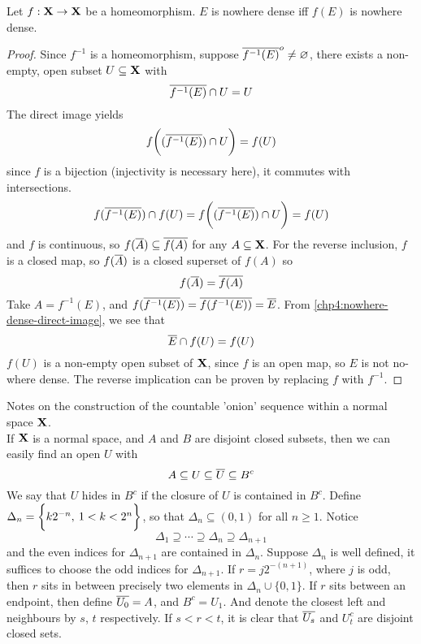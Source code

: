 \documentclass[../../main.tex]{subfiles}
\begin{document}
\begin{wts}\label{chp4:nowhere-dense-homeomorphisms}
    Let $f:{\mathbf{X}}\to{\mathbf{X}}$ be a homeomorphism. $E$ is nowhere dense iff $f(E)$ is nowhere dense.
\end{wts}
\begin{proof}
    Since $f^{-1}$ is a homeomorphism, suppose $\overline{f^{-1}(E)}^o\neq\varnothing$, there exists a non-empty, open subset $U\subseteq{\mathbf{X}}$ with
    \[
        \overline{f^{-1}(E)}\cap U = U
    \]
    The direct image yields 
    \[
        f\biggl((\overline{f^{-1}(E)})\cap U\biggr) = f(U)
    \]
    since $f$ is a bijection (injectivity is necessary here), it commutes with intersections.
    \begin{equation}\label{chp4:nowhere-dense-direct-image}
        f(\overline{f^{-1}(E)})\cap f(U) = f\biggl((\overline{f^{-1}(E)})\cap U\biggr) = f(U)
    \end{equation}
    and $f$ is continuous, so $f(\overline{A})\subseteq\overline{f(A)}$ for any $A\subseteq{\mathbf{X}}$. For the reverse inclusion, $f$ is a closed map, so $f(\overline{A})$ is a closed superset of $f(A)$ so 
    \[
        f(\overline{A}) = \overline{f(A)}
    \]
    Take $A = f^{-1}(E)$, and $f(\overline{f^{-1}(E)}) = \overline{f(f^{-1}(E))} = \overline{E}$. From \cref{chp4:nowhere-dense-direct-image}, we see that
    \[
        \overline{E}\cap f(U) = f(U)
    \]
    $f(U)$ is a non-empty open subset of ${\mathbf{X}}$, since $f$ is an open map, so $E$ is not no-where dense. The reverse implication can be proven by replacing $f$ with $f^{-1}$.
\end{proof}


\newpage


Notes on the construction of the countable 'onion' sequence within a normal space ${\mathbf{X}}$.\\

If ${\mathbf{X}}$ is a normal space, and $A$ and $B$ are disjoint closed subsets, then we can easily find an open $U$ with
\begin{equation}\label{eq:UrysohnLemma-Seashells}
    A\subseteq U \subseteq \overline{U}\subseteq B^c
\end{equation}
We say that $U$ hides in $B^c$ if the closure of $U$ is contained in $B^c$. Define $\Delta_n = \biggl\{{k2^{-n},\: 1 < k < 2^{n}}\biggr\}$, so that $\Delta_n\subseteq(0,1)$ for all $n\geq 1$. Notice 
\[
    \Delta_1\supseteq \cdots\supseteq \Delta_n\supseteq \Delta_{n+1}
\]
and the even indices for $\Delta_{n+1}$ are contained in $\Delta_n$. Suppose $\Delta_n$ is well defined, it suffices to choose the odd indices for $\Delta_{n+1}$. If $r = j2^{-(n+1)}$, where $j$ is odd, then $r$ sits in between precisely two elements in $\Delta_n\cup\{0,1\}$. If $r$ sits between an endpoint, then define $\overline{U_0} = A$, and $B^c = U_1$. And denote the closest left and neighbours by $s$, $t$ respectively. If $s<r<t$, it is clear that $\overline{U_s}$ and $U_t^c$ are disjoint closed sets.\\
\end{document}

